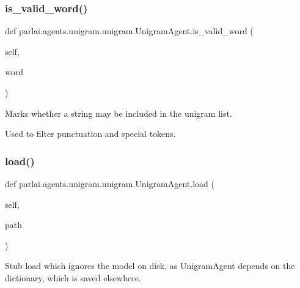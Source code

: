 \subsubsection{\texorpdfstring{is\+\_\+valid\+\_\+word()}{is\_valid\_word()}}
{\footnotesize\ttfamily def parlai.\+agents.\+unigram.\+unigram.\+Unigram\+Agent.\+is\+\_\+valid\+\_\+word (\begin{DoxyParamCaption}\item[{}]{self,  }\item[{}]{word }\end{DoxyParamCaption})}

\begin{DoxyVerb}Marks whether a string may be included in the unigram list.

Used to filter punctuation and special tokens.
\end{DoxyVerb}
 \mbox{\label{classparlai_1_1agents_1_1unigram_1_1unigram_1_1UnigramAgent_a01fa26682df757201166d6f18be60da8}} 
\subsubsection{\texorpdfstring{load()}{load()}}
{\footnotesize\ttfamily def parlai.\+agents.\+unigram.\+unigram.\+Unigram\+Agent.\+load (\begin{DoxyParamCaption}\item[{}]{self,  }\item[{}]{path }\end{DoxyParamCaption})}

\begin{DoxyVerb}Stub load which ignores the model on disk, as UnigramAgent depends on the
dictionary, which is saved elsewhere.
\end{DoxyVerb}
 \mbox{\label{classparlai_1_1agents_1_1unigram_1_1unigram_1_1UnigramAgent_a2c0cb628c4cc600b0968e6161d7a139a}} 

